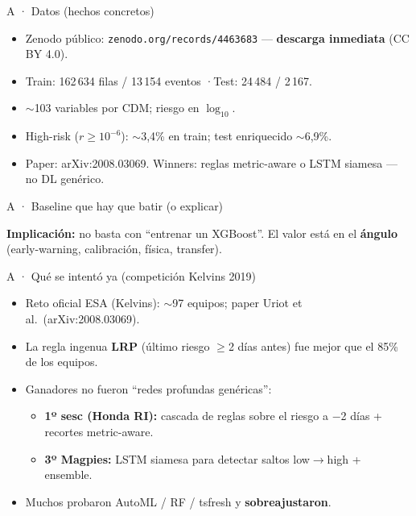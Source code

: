 \documentclass[aspectratio=169,10pt]{beamer}
\begin{document}
\begin{frame}{A · Datos (hechos concretos)}
  \begin{itemize}
    \item Zenodo público: \texttt{zenodo.org/records/4463683} --- \textbf{descarga inmediata} (CC BY 4.0).
    \item Train: 162\,634 filas / 13\,154 eventos \quad·\quad Test: 24\,484 / 2\,167.
    \item $\sim$103 variables por CDM; riesgo en $\log_{10}$.
    \item High-risk ($r\geq 10^{-6}$): $\sim$3{,}4\% en train; test enriquecido $\sim$6{,}9\%.
    \item Paper: arXiv:2008.03069. Winners: reglas metric-aware o LSTM siamesa --- no DL genérico.
  \end{itemize}
\end{frame}

\begin{frame}{A · Baseline que hay que batir (o explicar)}
  \begin{center}
  \end{center}
  \vspace{0.45em}
  \textbf{Implicación:} no basta con ``entrenar un XGBoost''. El valor está en el \textbf{ángulo} (early-warning, calibración, física, transfer).
\end{frame}

\begin{frame}{A · Qué se intentó ya (competición Kelvins 2019)}
  \begin{itemize}
    \item Reto oficial ESA (Kelvins): $\sim$97 equipos; paper Uriot et al.\ (arXiv:2008.03069).
    \item La regla ingenua \textbf{LRP} (último riesgo $\geq$2 días antes) fue mejor que el 85\% de los equipos.
    \item Ganadores no fueron ``redes profundas genéricas'':
    \begin{itemize}
      \item \textbf{1º sesc (Honda RI):} cascada de reglas sobre el riesgo a $-$2 días + recortes metric-aware.
      \item \textbf{3º Magpies:} LSTM siamesa para detectar saltos low$\to$high + ensemble.
    \end{itemize}
    \item Muchos probaron AutoML / RF / tsfresh y \textbf{sobreajustaron}.
  \end{itemize}
\end{frame}
\end{document}
